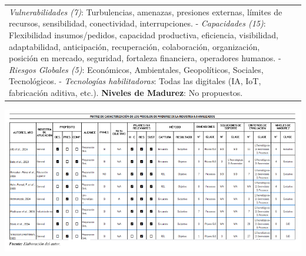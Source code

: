 \documentclass{article}
\begin{document}
\begin{longtable}[]{@{}
  >{\raggedright\arraybackslash}p{}
  >{\raggedright\arraybackslash}p{}@{}}
\emph{Vulnerabilidades (7)}: Turbulencias, amenazas, presiones externas,
límites de recursos, sensibilidad, conectividad, interrupciones. -
\emph{Capacidades (15)}: Flexibilidad insumos/pedidos, capacidad
productiva, eficiencia, visibilidad, adaptabilidad, anticipación,
recuperación, colaboración, organización, posición en mercado,
seguridad, fortaleza financiera, operadores humanos. - \emph{Riesgos
Globales (5)}: Económicos, Ambientales, Geopolíticos, Sociales,
Tecnológicos. - \emph{Tecnologías habilitadoras}: Todas las digitales
(IA, IoT, fabricación aditiva, etc.). \textbf{Niveles de Madurez}: No
propuestos. \\
\end{longtable}

\includegraphics{images/clipboard-275032378.png}
\end{document}
